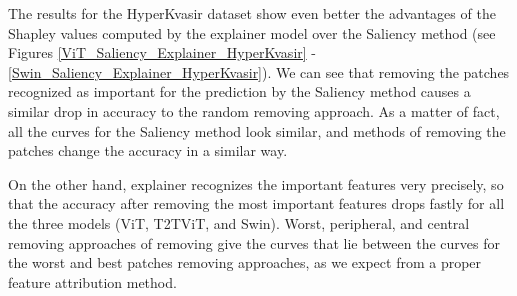 \documentclass[magisterska,en]{pracamgr}
\begin{document}
The results for the HyperKvasir dataset show even better the advantages of the Shapley values computed by the explainer model over the Saliency method (see Figures \ref{ViT_Saliency_Explainer_HyperKvasir} -\ref{Swin_Saliency_Explainer_HyperKvasir}). We can see that removing the patches recognized as important for the prediction by the Saliency method causes a similar drop in accuracy to the random removing approach. As a matter of fact, all the curves for the Saliency method look similar, and methods of removing the patches change the accuracy in a similar way.

On the other hand, explainer recognizes the important features very precisely, so that the accuracy after removing the most important features drops fastly for all the three models (ViT, T2T\textunderscore ViT, and Swin). Worst, peripheral, and central removing approaches of removing give the curves that lie between the curves for the worst and best patches removing approaches, as we expect from a proper feature attribution method.
\end{document}
